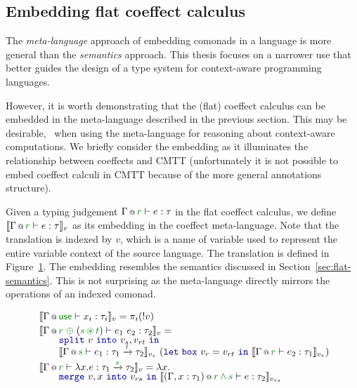 
\subsection{Embedding flat coeffect calculus}

The \emph{meta-language} approach of embedding comonads in a language is more general than the
\emph{semantics} approach. This thesis focuses on a narrower use that better guides the design of
a type system for context-aware programming languages. 

However, it is worth demonstrating that the (flat) coeffect calculus can be embedded in the 
meta-language described in the previous section. This may be desirable, \eg~when using the 
meta-language for reasoning about context-aware computations. We briefly consider the embedding 
as it illuminates the relationship between coeffects and CMTT (unfortunately it is not possible 
to embed coeffect calculi in CMTT because of the more general annotations structure).

Given a typing judgement $\coctx{\Gamma}{\cclrd{r}} \vdash e : \tau$ in the flat coeffect calculus,
we define $\sem{\coctx{\Gamma}{\cclrd{r}} \vdash e : \tau}_v$ as its embedding in the coeffect
meta-language. Note that the translation is indexed by $v$, which is a name of variable used 
to represent the entire variable context of the source language. The translation is defined in
Figure~\ref{fig:conclusions-embed}. The embedding resembles the semantics discussed in 
Section~\ref{sec:flat-semantics}. This is not surprising as the meta-language directly mirrors
the operations of an indexed comonad.


\begin{figure}[t]
\begin{equation*}
\begin{array}{l}
 \sem{ \coctx{\Gamma}{\cunit}\vdash x_i : \tau_i }_v = \pi_i (!v) \\[0.25em]
 \sem{ \coctx{\Gamma}{\cclrd{r}\;\cpar\;(\cclrd{s}\,\cseq\,\cclrd{t})} \vdash e_1~e_2 : \tau_2 }_v =\\[-0.25em]
   \qquad \kvd{split}~v~\kvd{into}~v_s, v_{rt}~\kvd{in} \\[-0.25em]
   \qquad \sem{ \coctx{\Gamma}{\cclrd{s}} \vdash e_1 : \tau_1 \xrightarrow{\cclrd{t}} \tau_2 }_{v_s}
      ~(\kvd{let\;box}~v_r = v_{rt}~\kvd{in}~\sem{ \coctx{\Gamma}{\cclrd{r}} \vdash e_2 : \tau_1}_{v_r}) \\[0.25em]
 \sem{ \coctx{\Gamma}{\cclrd{r}} \vdash \lambda x.e:\tau_1 \xrightarrow{\cclrd{s}} \tau_2 }_v = \lambda x. \\[-0.25em]
   \qquad \kvd{merge}~v,x~\kvd{into}~v_{rs}~\kvd{in}~\sem{ \coctx{(\Gamma,x:\tau_1)}{\cclrd{r}\,\czip\,\cclrd{s}} \vdash e : \tau_2 }_{v_{rs}}
\end{array}
\end{equation*}
\label{fig:conclusions-embed}
\end{figure}


